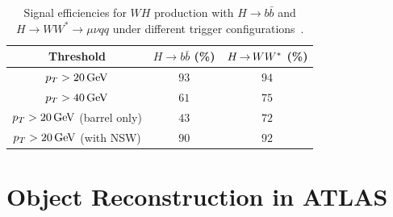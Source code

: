 \begin{table}[h!]
\centering
\captionsetup{justification=centering}

\hspace{-10pt}
\begin{tabular}{|c|c|c|}
\hline
Threshold & $H\to b\bar{b}$ (\%) & $H{\,{\rightarrow}\,}WW^\ast$ (\%) \\ \hline
$p_{T} > 20 \GeV$ & $93$ & $94$ \\ \hline
$p_{T} > 40 \GeV$ & $61$ & $75$ \\ \hline
$p_{T} > 20 \GeV$ (barrel only) & $43$ & $72$ \\ \hline
$p_{T} > 20 \GeV$ (with NSW) & $90$ & $92$ \\ \hline
\end{tabular}

\caption{
Signal efficiencies for $WH$ production with $H\to b\bar{b}$ and $H\to WW^* \to \mu \nu qq$ under different trigger configurations~\cite{NSW_TDR}.
}
\label{tab:NSW_trig_efficiencies}
\end{table}

\section{Object Reconstruction in ATLAS}
